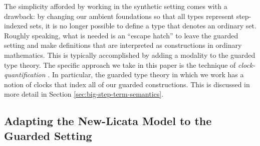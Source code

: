 The simplicity afforded by working in the synthetic setting comes with a
drawback: by changing our ambient foundations so that all types represent
step-indexed sets, it is no longer possible to define a type that denotes an
ordinary set. Roughly speaking, what is needed is an ``escape hatch'' to leave
the guarded setting and make definitions that are interpreted as constructions
in ordinary mathematics. This is typically accomplished by adding a modality to
the guarded type theory. The specific approach we take in this paper is the
technique of \emph{clock-quantification} \cite{atkey-mcbride2013}. In
particular, the guarded type theory in which we work has a notion of clocks that
index all of our guarded constructions. This is discussed in more detail in
Section \ref{sec:big-step-term-semantics}.

%



\subsection{Adapting the New-Licata Model to the Guarded Setting}


